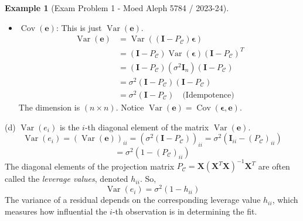 \documentclass[11pt]{article}
\theoremstyle{definition}
\newtheorem{example}[theorem]{Example}
\theoremstyle{remark}
\DeclareMathOperator{\Var}{\operatorname{Var}}
\DeclareMathOperator{\Cov}{\operatorname{Cov}}
\begin{document}
\begin{example}[Exam Problem 1 - Moed Aleph 5784 / 2023-24]
\begin{itemize}
    \item $\Cov(\bm{e})$: This is just $\Var(\bm{e})$.
    \begin{align*} \Var(\bm{e}) &= \Var((\bm{I}-P_{\mathcal{C}})\bm{\epsilon}) \\ &= (\bm{I}-P_{\mathcal{C}}) \Var(\bm{\epsilon}) (\bm{I}-P_{\mathcal{C}})^T \\ &= (\bm{I}-P_{\mathcal{C}}) (\sigma^2 \bm{I}_n) (\bm{I}-P_{\mathcal{C}}) \\ &= \sigma^2 (\bm{I}-P_{\mathcal{C}})(\bm{I}-P_{\mathcal{C}}) \\ &= \sigma^2 (\bm{I}-P_{\mathcal{C}}) \quad \text{(Idempotence)} \end{align*}
    The dimension is $(n \times n)$. Notice $\Var(\bm{e}) = \Cov(\bm{\epsilon}, \bm{e})$.
\end{itemize}

(d) $\Var(e_i)$ is the $i$-th diagonal element of the matrix $\Var(\bm{e})$.
\[ \Var(e_i) = (\Var(\bm{e}))_{ii} = (\sigma^2 (\bm{I}-P_{\mathcal{C}}))_{ii} = \sigma^2 (\bm{I}_{ii} - (P_{\mathcal{C}})_{ii}) \]
\[ = \sigma^2 (1 - (P_{\mathcal{C}})_{ii}) \]
The diagonal elements of the projection matrix $P_{\mathcal{C}} = \bm{X}(\bm{X}^T\bm{X})^{-1}\bm{X}^T$ are often called the \emph{leverage values}, denoted $h_{ii}$. So,
\[ \Var(e_i) = \sigma^2 (1 - h_{ii}) \]
The variance of a residual depends on the corresponding leverage value $h_{ii}$, which measures how influential the $i$-th observation is in determining the fit.
\end{example}
\end{document}
